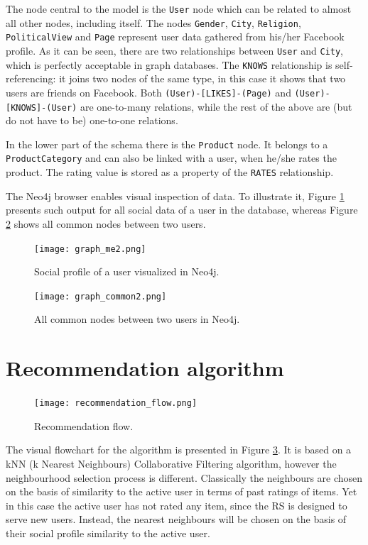 \documentclass[12pt]{report}
\begin{document}
The node central to the model is the \texttt{User} node which can be related to almost all other nodes, including itself. The nodes \texttt{Gender}, \texttt{City}, \texttt{Religion}, \texttt{Political\-View} and \texttt{Page} represent user data gathered from his/her Facebook profile. As it can be seen, there are two relationships between \texttt{User} and \texttt{City}, which is perfectly acceptable in graph databases. The \texttt{KNOWS} relationship is self-referencing: it joins two nodes of the same type, in this case it shows that two users are friends on Facebook. Both \texttt{(User)-[LIKES]-(Page)} and \texttt{(User)-[KNOWS]-(User)} are one-to-many relations, while the rest of the above are (but do not have to be) one-to-one relations.

In the lower part of the schema there is the \texttt{Product} node. It belongs to a \texttt{Product\-Category} and can also be linked with a user, when he/she rates the product. The rating value is stored as a property of the \texttt{RATES} relationship.

The Neo4j browser enables visual inspection of data. To illustrate it, Figure \ref{fig.graph_me} presents such output for all social data of a user in the database, whereas Figure \ref{fig.graph_common} shows all common nodes between two users.

\begin{figure}
\centering
\texttt{[image: graph\_me2.png]} 
\caption{Social profile of a user visualized in Neo4j.}
\label{fig.graph_me}
\end{figure}

\begin{figure}
\centering
\texttt{[image: graph\_common2.png]} 
\caption{All common nodes between two users in Neo4j.}
\label{fig.graph_common}
\end{figure}


\section{Recommendation algorithm}

\begin{figure}
\centering
\texttt{[image: recommendation\_flow.png]} 
\caption[Recommendation flow.]{Recommendation flow.}
\label{fig.recommendation_flow}
\end{figure}

The visual flowchart for the algorithm is presented in Figure \ref{fig.recommendation_flow}. It is based on a kNN (k Nearest Neighbours) Collaborative Filtering algorithm, however the neighbourhood selection process is different. Classically the neighbours are chosen on the basis of similarity to the active user in terms of past ratings of items. Yet in this case the active user has not rated any item, since the RS is designed to serve new users. Instead, the nearest neighbours will be chosen on the basis of their social profile similarity to the active user.
\end{document}
